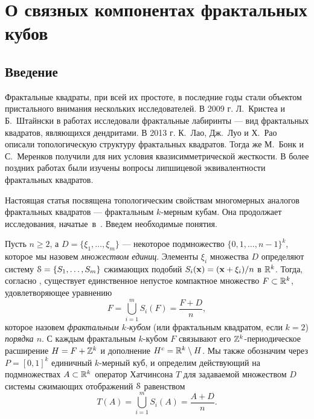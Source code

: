 \chapter{О связных компонентах фрактальных кубов}

\section{Введение}

Фрактальные квадраты, при всей их простоте, в последние годы стали объектом пристального внимания нескольких исследователей. В 2009 г. Л.~Кристеа и Б.~Штайнски в работах \cite{CS1,CS2} исследовали фрактальные лабиринты  --- вид фрактальных квадратов, являющихся дендритами. В 2013 г. К.~Лао, Дж.~Луо и Х.~Рао \cite{LLR2013} описали топологическую структуру фрактальных квадратов. Тогда же М.~Бонк и С.~Меренков \cite{BM} получили для них условия квазисимметрической жесткости. В более поздних работах \cite{LL,RW} были изучены вопросы липшицевой эквивалентности фрактальных квадратов.

Настоящая статья посвящена топологическим свойствам многомерных аналогов фрактальных квадратов --- фрактальным $k$-мерным кубам.
Она продолжает исследования, начатые~в~\cite{frcube}.
Введем необходимые понятия.



Пусть $n\geq 2$, а  $ D=\{\xi_1,\ldots,\xi_m\}$ ---  некоторое подмножество  $ \{0,1, \ldots , n-1\}^k$,  которое  мы назовем {\em множеством единиц}. Элементы $\xi_i$ множества $ D$ определяют систему ${\EuScript S}=\{S_1,\ldots,S_m\}$ сжимающих подобий $S_i({\bf{x}})=({\bf{x}}+\xi_i)/n$ в $\mathbb{R}^k$. Тогда, согласно  \cite[Theorem(3), p.10]{Hut}, существует единственное непустое компактное множество $F\subset \mathbb{R}^k$, удовлетворяющее уравнению 
\begin{equation}\label{Feq} 
F=\bigcup\limits_{i=1}^m S_i(F)=\frac{F+ D}{n},
\end{equation}
которое назовем {\em фрактальным $k$-кубом} (или фрактальным квадратом, если $k=2$) {\em порядка $n$}.
С каждым фрактальным $k$-кубом $F$   связывают его $\mathbb{Z}^k$-периодическое расширение
 $H=F+\mathbb{Z}^k$  и   дополнение $H^c=\mathbb{R}^k\setminus H$. Мы также обозначим через $P=[0,1]^k$ единичный $k$-мерный куб, и  определим действующий на  подмножествах  $A\subset \mathbb{R}^k$  оператор Хатчинсона $T$ для задаваемой множеством $ D$ системы сжимающих отображений ${\EuScript S}$  равенством  
\begin{equation}
T(A)=\bigcup\limits_{i=1}^m S_i(A)=\dfrac{A+ D}{n}.
\end{equation}

